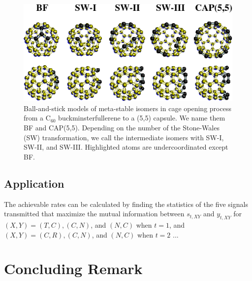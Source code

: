 \documentclass[master,english,final]{kaist-ucs}
\begin{document}
\begin{figure}[t]
    \centerline{\includegraphics[width=12.5cm]{sample-fig1}}
    \caption[Enter the caption title here]{ Ball-and-stick models of meta-stable isomers in
        cage opening process from a C$_{60}$ buckminsterfullerene
        to a (5,5) capsule. We name them BF and CAP(5,5).
        Depending on the number of the Stone-Wales (SW) transformation,
        we call the intermediate isomers with SW-I, SW-II, and SW-III.
        Highlighted atoms are undercoordinated except BF.
    } \label{mag-fig1}
\end{figure}

\section{Application}

The achievable rates can be calculated by finding the statistics of the five signals transmitted that maximize the mutual information between $s_{t,XY}$ and $y_{t,XY}$ for $(X,Y)=(T,C), (C,N)$, and $(N,C)$ when $t=1$, and $(X,Y)=(C,R), (C,N)$, and $(N,C)$ when $t=2$ \cite{SOCA2,EF2}...


\chapter{Concluding Remark}
\end{document}
